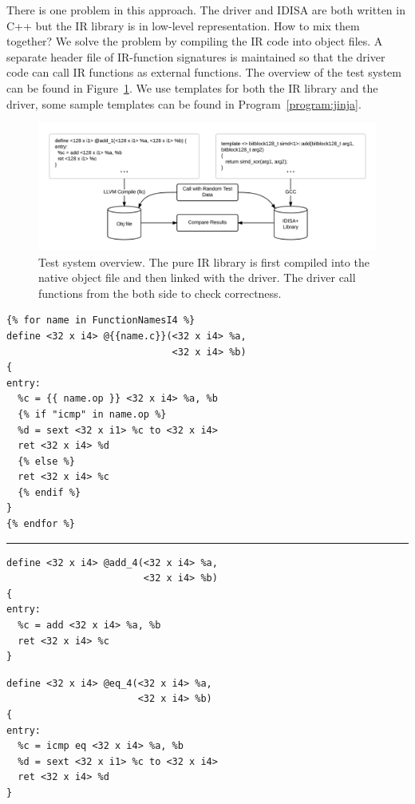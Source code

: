 There is one problem in this approach. The driver and IDISA are both written in C++ but the IR library is in low-level representation. How to mix them together? We solve the problem by compiling the IR code into object files. A separate header file of IR-function signatures is maintained so that the driver code can call IR functions as external functions. The overview of the test system can be found in Figure~\ref{figure:test}. We use templates for both the IR library and the driver, some sample templates can be found in Program~\ref{program:jinja}.


\begin{figure}[hbpt!]
\centering
\includegraphics[width=140mm]{draw/test.png}
\caption[Test system overview.]{Test system overview. The pure IR library is first compiled into the native object file and then linked with the driver. The driver call functions from the both side to check correctness.}
\label{figure:test}
\end{figure}

\begin{program}
\begin{verbatim}
{% for name in FunctionNamesI4 %}
define <32 x i4> @{{name.c}}(<32 x i4> %a,
                             <32 x i4> %b)
{
entry:
  %c = {{ name.op }} <32 x i4> %a, %b
  {% if "icmp" in name.op %}
  %d = sext <32 x i1> %c to <32 x i4>
  ret <32 x i4> %d
  {% else %}
  ret <32 x i4> %c
  {% endif %}
}
{% endfor %}
\end{verbatim}
\rule{\textwidth}{1pt}

\begin{multicols}{2}
\begin{verbatim}
define <32 x i4> @add_4(<32 x i4> %a,
                        <32 x i4> %b)
{
entry:
  %c = add <32 x i4> %a, %b
  ret <32 x i4> %c
}
\end{verbatim}
\columnbreak
\begin{verbatim}
define <32 x i4> @eq_4(<32 x i4> %a,
                       <32 x i4> %b)
{
entry:
  %c = icmp eq <32 x i4> %a, %b
  %d = sext <32 x i1> %c to <32 x i4>
  ret <32 x i4> %d
}
\end{verbatim}
\end{multicols}
\caption[Templates for the IR Libray]{Templates for the IR Library. On the top is the template, and two different output are listed below. We use embedded for loop and if statements.}
\label{program:jinja}
\end{program}
